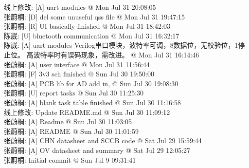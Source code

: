 \documentclass[a4paper]{paper}
\begin{document}
线上修改: [A] uart modules @ Mon Jul 31 20:08:05\\ 
张蔚桐: [D] del some unuseful qss file @ Mon Jul 31 19:47:15\\ 
张蔚桐: [R] UI basically finished @ Mon Jul 31 18:42:03\\ 
陈崴: [U] bluetooth communication @ Mon Jul 31 16:32:17\\ 
陈崴: [A] uart modules 	Verilog串口模块，波特率可调，8数据位，无校验位，1停止位。 	高波特率时有误码现象，需改进。 @ Mon Jul 31 16:14:46\\ 
张蔚桐: [A] user interface @ Mon Jul 31 11:56:44\\ 
张蔚桐: [F] 3v3 sch finished @ Sun Jul 30 19:50:00\\ 
张蔚桐: [A] PCB lib for AD add in, @ Sun Jul 30 19:08:30\\ 
张蔚桐: [U] report tasks @ Sun Jul 30 11:25:30\\ 
张蔚桐: [A] blank task table finished @ Sun Jul 30 11:16:58\\ 
线上修改: Update README.md @ Sun Jul 30 11:09:12\\ 
张蔚桐: [A] Readme @ Sun Jul 30 11:03:05\\ 
张蔚桐: [A] README @ Sun Jul 30 11:01:59\\ 
张蔚桐: [A] CHN datasheet and SCCB code @ Sat Jul 29 15:59:44\\ 
张蔚桐: [A] OV datasheet and summary @ Sat Jul 29 12:05:27\\ 
张蔚桐: Initial commit @ Sun Jul 9 09:31:41\\ 
\end{document}

